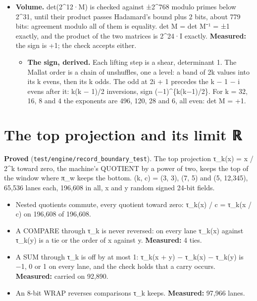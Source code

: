 \begin{itemize}
\item \textbf{Volume.} det(2\textasciicircum{}12·M) is checked against ±2\textasciicircum{}768 modulo primes below 2\textasciicircum{}31, until their product passes Hadamard's bound plus 2 bits, about 779 bits: agreement modulo all of them is equality. det M = det M⁻¹ = ±1 exactly, and the product of the two matrices is 2\textasciicircum{}24·I exactly. \textbf{Measured:} the sign is +1; the check accepts either.

\begin{itemize}
\item \textbf{The sign, derived.} Each lifting step is a shear, determinant 1. The Mallat order is a chain of unshuffles, one a level: a band of 2k values into its k evens, then its k odds. The odd at 2i + 1 precedes the k − 1 − i evens after it: k(k − 1)/2 inversions, sign (−1)\textasciicircum{}\{k(k−1)/2\}. For k = 32, 16, 8 and 4 the exponents are 496, 120, 28 and 6, all even: det M = +1.
\end{itemize}
\end{itemize}

\section{\texorpdfstring{The top projection and its limit ℝ}{The top projection and its limit ℝ}}

\textbf{Proved} (\texttt{test/\allowbreak{}engine/\allowbreak{}record\_\allowbreak{}boundary\_\allowbreak{}test}). The top projection τ\_\allowbreak{}k(x) = x / 2\textasciicircum{}k toward zero, the machine's QUOTIENT by a power of two, keeps the top of the window where π\_\allowbreak{}w keeps the bottom. (k, c) = (3, 3), (7, 5) and (5, 12,345), 65,536 lanes each, 196,608 in all, x and y random signed 24-bit fields.

\begin{itemize}
\item Nested quotients commute, every quotient toward zero: τ\_\allowbreak{}k(x) / c = τ\_\allowbreak{}k(x / c) on 196,608 of 196,608.
\item A COMPARE through τ\_\allowbreak{}k is never reversed: on every lane τ\_\allowbreak{}k(x) against τ\_\allowbreak{}k(y) is a tie or the order of x against y. \textbf{Measured:} 4 ties.
\item A SUM through τ\_\allowbreak{}k is off by at most 1: τ\_\allowbreak{}k(x + y) − τ\_\allowbreak{}k(x) − τ\_\allowbreak{}k(y) is −1, 0 or 1 on every lane, and the check holds that a carry occurs. \textbf{Measured:} carried on 92,890.
\item An 8-bit WRAP reverses comparisons τ\_\allowbreak{}k keeps. \textbf{Measured:} 97,966 lanes.
\end{itemize}

